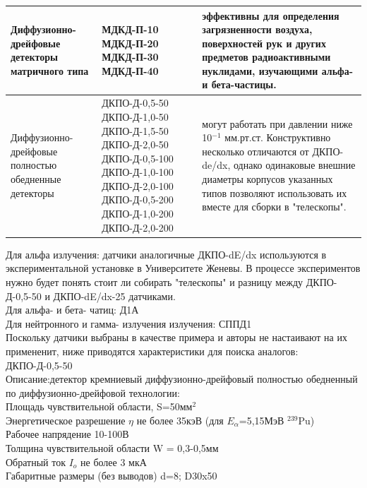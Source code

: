 \documentclass[11pt]{report}
\begin{document}
\begin{tabular}{|p{2.5cm}|p{3.5cm}|p{8.5cm}|}
\hline
	Диффузионно-дрейфовые детекторы матричного типа & МДКД-П-10 \linebreak МДКД-П-20 \linebreak МДКД-П-30 \linebreak МДКД-П-40 & эффективны для определения загрязненности воздуха, поверхностей рук и других предметов радиоактивными нуклидами, изучающими альфа- и бета-частицы.\\
\hline
	Диффузионно-дрейфовые полностью обедненные детекторы & ДКПО-Д-0,5-50 ДКПО-Д-1,0-50 ДКПО-Д-1,5-50 ДКПО-Д-2,0-50 ДКПО-Д-0,5-100 ДКПО-Д-1,0-100 ДКПО-Д-2,0-100 ДКПО-Д-0,5-200 ДКПО-Д-1,0-200 ДКПО-Д-2,0-200 & могут работать при давлении ниже 10$^{-1}$ мм.рт.ст. Конструктивно несколько отличаются от ДКПО-de/dx, однако одинаковые внешние диаметры корпусов указанных типов позволяют использовать их вместе для сборки в "телескопы".\\
\hline
\end{tabular}

Для альфа излучения: датчики аналогичные ДКПО-dE/dx используются в экспериментальной установке в Университете Женевы. В процессе экспериментов нужно будет понять стоит ли собирать "телескопы" и разницу между ДКПО-Д-0,5-50 и ДКПО-dE/dx-25 датчиками. \\

Для альфа- и бета- чатиц: Д1А\\

Для нейтронного и гамма- излучения излучения: СППД1 \\

Поскольку датчики выбраны в качестве примера и авторы не настаивают на их примененит, ниже приводятся характеристики для поиска аналогов:\\

ДКПО-Д-0,5-50 \\
  Описание:детектор кремниевый диффузионно-дрейфовый полностью обедненный по диффузионно-дрейфовой технологии:\\
Площадь чувствительной области, S=50мм$^2$ \\
Энергетическое разрешение $\eta$ не более 35кэВ (для $E_\alpha $=5,15МэВ $ ^239 $Pu) \\
Рабочее напрядение 10-100В \\
Толщина чувствительной области W = 0,3-0,5мм \\
Обратный ток $I_{o}$ не более 3 мкА \\
Габаритные размеры (без выводов) d=8; D30x50 \\
\end{document}
